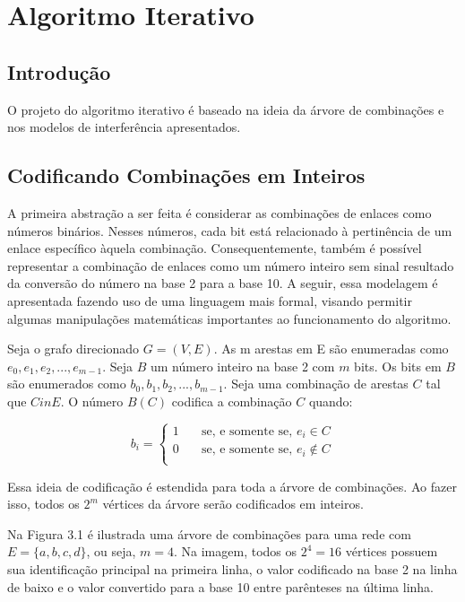\chapter{Algoritmo Iterativo}
\label{cap:iterativo}

\section{Introdução}

O projeto do algoritmo iterativo é baseado na ideia da árvore de combinações e nos modelos de interferência apresentados.

\section{Codificando Combinações em Inteiros}

A primeira abstração a ser feita é considerar as combinações de enlaces como números binários. Nesses números, cada bit está relacionado à pertinência de um enlace específico àquela combinação. Consequentemente, também é possível representar a combinação de enlaces como um número inteiro sem sinal resultado da conversão do número na base 2 para a base 10. A seguir, essa modelagem é apresentada fazendo uso de uma linguagem mais formal, visando permitir algumas manipulações matemáticas importantes ao funcionamento do algoritmo.

Seja o grafo direcionado $G=(V,E)$. As m arestas em E são enumeradas como $e_0, e_1, e_2, ..., e_{m-1}$. Seja $B$ um número inteiro na base 2 com $m$ bits. Os bits em $B$ são enumerados como $b_0, b_1, b_2, ..., b_{m-1}$. Seja uma combinação de arestas $C$ tal que $C in E$. O número $B(C)$ codifica a combinação $C$ quando:

\[ b_i =
\begin{cases}
	1	& \quad	\text{se, e somente se, } e_i \in C \\
	0	& \quad	\text{se, e somente se, } e_i \notin C \\
  \end{cases}
\]

Essa ideia de codificação é estendida para toda a árvore de combinações. Ao fazer isso, todos os $2^m$ vértices da árvore serão codificados em inteiros.


Na Figura 3.1 é ilustrada uma árvore de combinações para uma rede com $E=\{a,b,c,d\}$, ou seja, $m=4$. Na imagem, todos os $2^4 = 16$ vértices possuem sua identificação principal na primeira linha, o valor codificado na base 2 na linha de baixo e o valor convertido para a base 10 entre parênteses na última linha.

